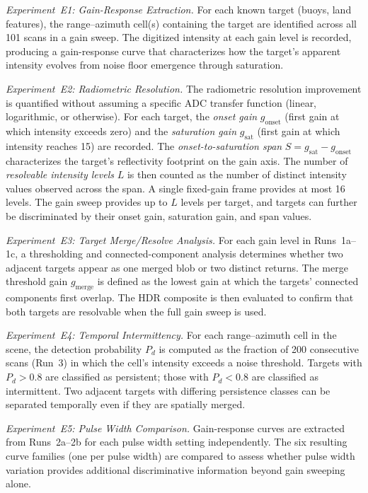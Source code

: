 \documentclass[colorlinks,upint,balance]{asmeconf}
\begin{document}
\textit{Experiment~E1: Gain-Response Extraction.} For each known target (buoys, land features), the range--azimuth cell(s) containing the target are identified across all 101 scans in a gain sweep. The digitized intensity at each gain level is recorded, producing a gain-response curve that characterizes how the target's apparent intensity evolves from noise floor emergence through saturation.

\textit{Experiment~E2: Radiometric Resolution.} The radiometric resolution improvement is quantified without assuming a specific ADC transfer function (linear, logarithmic, or otherwise). For each target, the \textit{onset gain} $g_{\text{onset}}$ (first gain at which intensity exceeds zero) and the \textit{saturation gain} $g_{\text{sat}}$ (first gain at which intensity reaches 15) are recorded. The \textit{onset-to-saturation span} $S = g_{\text{sat}} - g_{\text{onset}}$ characterizes the target's reflectivity footprint on the gain axis. The number of \textit{resolvable intensity levels} $L$ is then counted as the number of distinct intensity values observed across the span. A single fixed-gain frame provides at most 16 levels. The gain sweep provides up to $L$ levels per target, and targets can further be discriminated by their onset gain, saturation gain, and span values.

\textit{Experiment~E3: Target Merge/Resolve Analysis.} For each gain level in Runs~1a--1c, a thresholding and connected-component analysis determines whether two adjacent targets appear as one merged blob or two distinct returns. The merge threshold gain $g_{\text{merge}}$ is defined as the lowest gain at which the targets' connected components first overlap. The HDR composite is then evaluated to confirm that both targets are resolvable when the full gain sweep is used.

\textit{Experiment~E4: Temporal Intermittency.} For each range--azimuth cell in the scene, the detection probability $P_d$ is computed as the fraction of 200 consecutive scans (Run~3) in which the cell's intensity exceeds a noise threshold. Targets with $P_d > 0.8$ are classified as persistent; those with $P_d < 0.8$ are classified as intermittent. Two adjacent targets with differing persistence classes can be separated temporally even if they are spatially merged.

\textit{Experiment~E5: Pulse Width Comparison.} Gain-response curves are extracted from Runs~2a--2b for each pulse width setting independently. The six resulting curve families (one per pulse width) are compared to assess whether pulse width variation provides additional discriminative information beyond gain sweeping alone.
\end{document}
